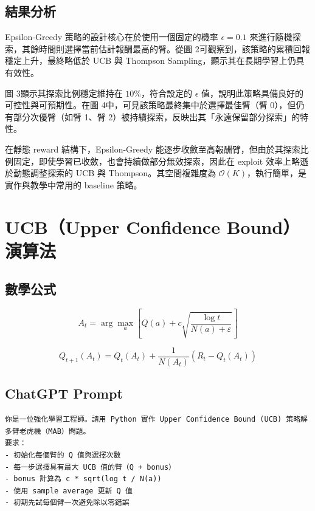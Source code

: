 \documentclass{article}
\begin{document}
\subsection*{結果分析}
Epsilon-Greedy 策略的設計核心在於使用一個固定的機率 \( \epsilon = 0.1 \) 來進行隨機探索，其餘時間則選擇當前估計報酬最高的臂。從圖 2可觀察到，該策略的累積回報穩定上升，最終略低於 UCB 與 Thompson Sampling，顯示其在長期學習上仍具有效性。

圖 3顯示其探索比例穩定維持在 \( 10\% \)，符合設定的 \( \epsilon \) 值，說明此策略具備良好的可控性與可預期性。在圖 4中，可見該策略最終集中於選擇最佳臂（臂 0），但仍有部分次優臂（如臂 1、臂 2）被持續探索，反映出其「永遠保留部分探索」的特性。

在靜態 reward 結構下，Epsilon-Greedy 能逐步收斂至高報酬臂，但由於其探索比例固定，即使學習已收斂，也會持續做部分無效探索，因此在 exploit 效率上略遜於動態調整探索的 UCB 與 Thompson。其空間複雜度為 \( \mathcal{O}(K) \)，執行簡單，是實作與教學中常用的 baseline 策略。

\newpage

\section{UCB（Upper Confidence Bound）演算法}

\subsection*{數學公式}
\begin{equation*}
A_t = \arg\max_a \left[ Q(a) + c \sqrt{\frac{\log t}{N(a) + \varepsilon}} \right]
\end{equation*}

\begin{equation*}
Q_{t+1}(A_t) = Q_t(A_t) + \frac{1}{N(A_t)}(R_t - Q_t(A_t))
\end{equation*}

\subsection*{ChatGPT Prompt}
\begin{verbatim}
你是一位強化學習工程師。請用 Python 實作 Upper Confidence Bound (UCB) 策略解多臂老虎機（MAB）問題。
要求：
- 初始化每個臂的 Q 值與選擇次數
- 每一步選擇具有最大 UCB 值的臂（Q + bonus）
- bonus 計算為 c * sqrt(log t / N(a))
- 使用 sample average 更新 Q 值
- 初期先試每個臂一次避免除以零錯誤

\end{verbatim}
\end{document}
